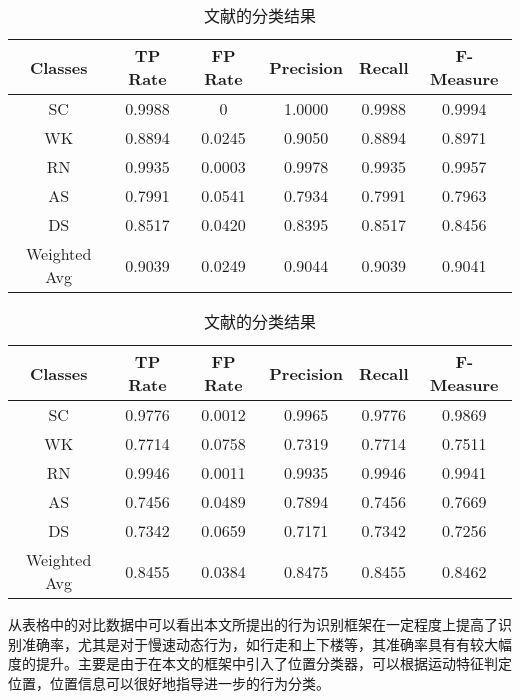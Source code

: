  \begin{table}[htb]
    \centering
    \caption{文献\cite{orientationTransation1}的分类结果}\label{com_result1}
    \begin{tabular}{cccccc}
    \toprule
    Classes & TP Rate & FP Rate & Precision & Recall & F-Measure \\
    \midrule
    SC & 0.9988 & 0 & 1.0000 & 0.9988 & 0.9994 \\
    WK & 0.8894 & 0.0245 & 0.9050 & 0.8894 & 0.8971	\\
    RN & 0.9935 & 0.0003 & 0.9978 & 0.9935 & 0.9957	\\
    AS & 0.7991 & 0.0541 & 0.7934 & 0.7991 & 0.7963 \\
    DS & 0.8517 & 0.0420 & 0.8395 & 0.8517 & 0.8456	\\
    \hline
    Weighted Avg & 0.9039 & 0.0249 & 0.9044 & 0.9039 & 0.9041 \\
    \bottomrule
    \end{tabular}
 \end{table}

  \begin{table}[htb]
    \centering
    \caption{文献\cite{bisio2014comparison}的分类结果}\label{com_result2}
    \begin{tabular}{cccccc}
    \toprule
    Classes & TP Rate & FP Rate & Precision & Recall & F-Measure \\
    \midrule
    SC & 0.9776 & 0.0012 & 0.9965 & 0.9776 & 0.9869 \\
    WK & 0.7714 & 0.0758 & 0.7319 & 0.7714 & 0.7511 \\
    RN & 0.9946 & 0.0011 & 0.9935 & 0.9946 & 0.9941 \\
    AS & 0.7456 & 0.0489 & 0.7894 & 0.7456 & 0.7669 \\
    DS & 0.7342 & 0.0659 & 0.7171 & 0.7342 & 0.7256 \\
    
    Weighted Avg & 0.8455 & 0.0384 & 0.8475 & 0.8455 & 0.8462 \\
    \bottomrule
    \end{tabular}
 \end{table}
\par 从表格中的对比数据中可以看出本文所提出的行为识别框架在一定程度上提高了识别准确率，尤其是对于慢速动态行为，如行走和上下楼等，其准确率具有有较大幅度的提升。主要是由于在本文的框架中引入了位置分类器，可以根据运动特征判定位置，位置信息可以很好地指导进一步的行为分类。
